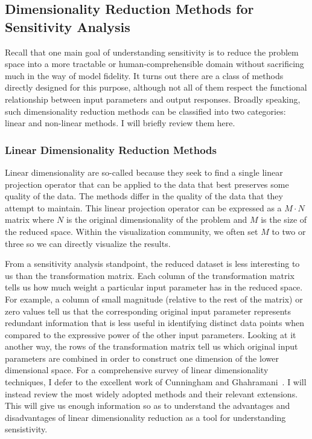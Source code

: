 \subsection{Dimensionality Reduction Methods for Sensitivity Analysis}

Recall that one main goal of understanding sensitivity is to reduce the problem space into a more tractable or human-comprehensible domain without sacrificing much in the way of model fidelity.
%
It turns out there are a class of methods directly designed for this purpose, although not all of them respect the functional relationship between input parameters and output responses.
%
Broadly speaking, such dimensionality reduction methods can be classified into two categories: linear and non-linear methods.
%
I will briefly review them here.

\subsubsection{Linear Dimensionality Reduction Methods}

Linear dimensionality are so-called because they seek to find a single linear projection operator that can be applied to the data that best preserves some quality of the data.
%
The methods differ in the quality of the data that they attempt to maintain.
%
This linear projection operator can be expressed as a $M \cdot N$ matrix where $N$ is the original dimensionality of the problem and $M$ is the size of the reduced space.
%
Within the visualization community, we often set $M$ to two or three so we can directly visualize the results.

From a sensitivity analysis standpoint, the reduced dataset is less interesting to us than the transformation matrix.
%
Each column of the transformation matrix tells us how much weight a particular input parameter has in the reduced space.
%
For example, a column of small magnitude (relative to the rest of the matrix) or zero values tell us that the corresponding original input parameter represents redundant information that is less useful in identifying distinct data points when compared to the expressive power of the other input parameters.
%
Looking at it another way, the rows of the transformation matrix tell us which original input parameters are combined in order to construct one dimension of the lower dimensional space.
%
For a comprehensive survey of linear dimensionality techniques, I defer to the excellent work of Cunningham and Ghahramani~\cite{CunninghamGhahramani2015}.
%
I will instead review the most widely adopted methods and their relevant extensions.
%
This will give us enough information so as to understand the advantages and disadvantages of linear dimensionality reduction as a tool for understanding sensistivity.

